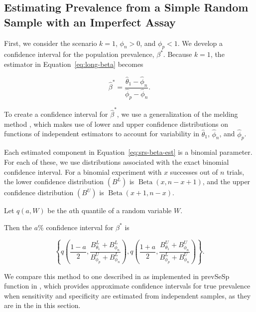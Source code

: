 \documentclass[AMA,STIX1COL]{WileyNJD-v2}
\begin{document}
\subsection{Estimating Prevalence from a Simple Random Sample with an Imperfect Assay}
\label{sec:srs-imperfect}

First, we consider the scenario \( k = 1 \), \( \phi_n > 0 \), and \( \phi_p < 1 \).
We develop a confidence interval for the population prevalence, \( \beta^* \).
Because \( k = 1 \), the estimator in Equation~\ref{eq:long-beta} becomes 

\begin{equation}
\hat{\beta}^* = \frac{\hat{\theta}_1 - \hat{\phi}_n}{\hat{\phi}_p - \hat{\phi}_n}.
\label{eq:srs-beta-est}
\end{equation}

To create a confidence interval for \( \hat{\beta}^* \), we use a generalization of the melding method \cite{FayP:2015}, which makes use of lower and upper confidence distributions on functions of independent estimators to account for variability in \( \hat{\theta}_1 \), \( \hat{\phi}_n \), and \( \hat{\phi}_p \).

Each estimated component in Equation~\ref{eq:srs-beta-est} is a binomial parameter.
For each of these, we use distributions associated with  the exact binomial confidence interval.
For a binomial experiment with \( x \) successes out of \( n \) trials, the lower confidence distribution \( (B^L) \) is \( \operatorname{Beta}(x, n - x + 1) \), and the upper confidence distribution \( (B^U) \) is \( \operatorname{Beta}(x + 1, n - x)\).

Let \( q(a, W) \) be the \( a \)th quantile of a random variable \( W \).

Then the \( a \)\% confidence interval for \( \beta^* \) is 

\begin{equation}
    \left\{ q \left( \frac{1 - a}{2}, \frac{B_{\theta_1}^L + B_{\phi_n}^L }{B_{\phi_p}^U + B_{\phi_n}^L }  \right),  q \left( \frac{1 + a}{2}, \frac{B_{\theta_1}^U + B_{\phi_n}^U}{B_{\phi_p}^L + B_{\phi_n}^U}  \right) \right\}.
\end{equation}

We compare this method to one described in \cite{Lang:2014} as implemented in prevSeSp function in \cite{asht}, which provides approximate confidence intervals for true prevalence when sensitivity and specificity are estimated from independent samples, as they are in the in this section.
\end{document}
